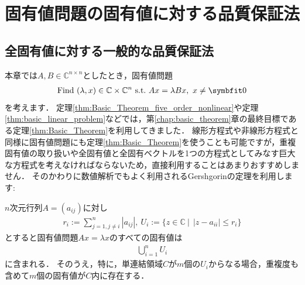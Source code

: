 \chapter{固有値問題の固有値に対する品質保証法}\label{chap:eigenvalue}

%
\section{全固有値に対する一般的な品質保証法}\label{sec:standard_eigenvalue}
本章では$A, B \in {\mathbb C}^{n \times n}$としたとき，固有値問題
\begin{align*}
	\mbox{Find} ~ (\lambda, x) \in {\mathbb C} \times {\mathbb C}^n ~ \mbox{s.t.} ~ A x = \lambda B x, ~ x \neq \vector{0}
\end{align*}
を考えます．
定理\ref{thm:Basic_Theorem_five_order_nonlinear}や定理\ref{thm:basic_linear_problem}などでは，第\ref{chap:basic_theorem}章の最終目標である定理\ref{thm:Basic_Theorem}を利用してきました．
線形方程式や非線形方程式と同様に固有値問題にも定理\ref{thm:Basic_Theorem}を使うことも可能ですが，重複固有値の取り扱いや全固有値と全固有ベクトルを1つの方程式としてみなす巨大な方程式を考えなければならないため，直接利用することはあまりおすすめしません．
そのかわりに数値解析でもよく利用されるGershgorinの定理を利用します:

\begin{Thm}[Gershgorinの定理]\label{thm:gerschgorin}
	$n$次元行列$A = (a_{ij})$に対し
	\begin{align*}
		r_i := \sum_{j = 1, j \neq i}^n | a_{ij} |, ~ U_i := \{ z \in {\mathbb C} ~|~~ | z - a_{ii} | \le r_i  \}
	\end{align*}
	とすると固有値問題$A x = \lambda x$のすべての固有値は
	\begin{align*}
		\bigcup_{i = 1}^{n} U_i
	\end{align*}
	に含まれる．
	そのうえ，特に，単連結領域$C$が$m$個の$U_i$からなる場合，重複度も含めて$m$個の固有値が$C$内に存在する．
\end{Thm}

